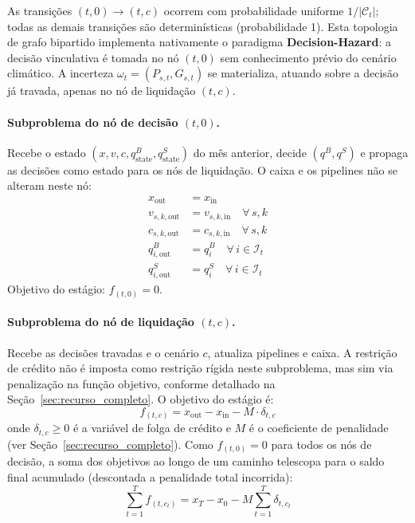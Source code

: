 \documentclass[12pt, a4paper]{article}
\begin{document}
As transições $(t,0) \to (t,c)$ ocorrem com probabilidade uniforme $1/|\mathcal{C}_t|$; todas as demais transições são determinísticas (probabilidade 1). Esta topologia de grafo bipartido implementa nativamente o paradigma \textbf{Decision-Hazard}: a decisão vinculativa é tomada no nó $(t,0)$ sem conhecimento prévio do cenário climático. A incerteza $\omega_t = (P_{s,t}, G_{s,t})$ se materializa, atuando sobre a decisão já travada, apenas no nó de liquidação $(t,c)$.

\paragraph{Subproblema do nó de decisão $(t, 0)$.}
Recebe o estado $(x, v, c, q^B_{\text{state}}, q^S_{\text{state}})$ do mês anterior, decide $(q^B, q^S)$ e propaga as decisões como estado para os nós de liquidação. O caixa e os pipelines não se alteram neste nó:
\begin{align}
    x_{\text{out}} &= x_{\text{in}} \\
    v_{s,k,\text{out}} &= v_{s,k,\text{in}} \quad \forall\, s,k \\
    c_{s,k,\text{out}} &= c_{s,k,\text{in}} \quad \forall\, s,k \\
    q^B_{i,\text{out}} &= q^B_i \quad \forall\, i \in \mathcal{I}_t \\
    q^S_{i,\text{out}} &= q^S_i \quad \forall\, i \in \mathcal{I}_t
\end{align}
Objetivo do estágio: $f_{(t,0)} = 0$.

\paragraph{Subproblema do nó de liquidação $(t, c)$.}
Recebe as decisões travadas e o cenário $c$, atualiza pipelines e caixa. A restrição de crédito não é imposta como restrição rígida neste subproblema, mas sim via penalização na função objetivo, conforme detalhado na Seção~\ref{sec:recurso_completo}. O objetivo do estágio é:
\begin{equation}
    f_{(t,c)} = x_{\text{out}} - x_{\text{in}} - M \cdot \delta_{t,c}
    \label{eq:obj_sddp}
\end{equation}
onde $\delta_{t,c} \ge 0$ é a variável de folga de crédito e $M$ é o coeficiente de penalidade (ver Seção~\ref{sec:recurso_completo}).
Como $f_{(t,0)} = 0$ para todos os nós de decisão, a soma dos objetivos ao longo de um caminho telescopa para o saldo final acumulado (descontada a penalidade total incorrida):
\begin{equation}
    \sum_{t=1}^{T} f_{(t,c_t)} = x_T - x_0 - M \sum_{t=1}^{T} \delta_{t,c_t}
\end{equation}
\end{document}
